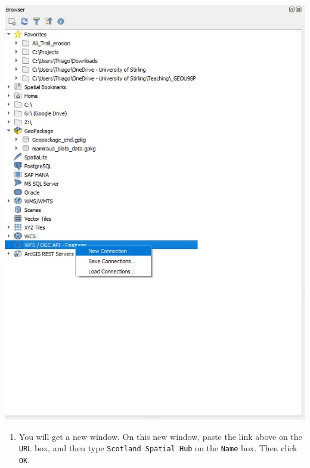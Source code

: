 \documentclass[
  letterpaper,
  DIV=11,
  numbers=noendperiod]{scrreprt}
\providecommand{\tightlist}{%
  \setlength{\itemsep}{0pt}\setlength{\parskip}{0pt}}\usepackage{longtable,booktabs,array}
\begin{document}
\includegraphics{images/lab_11/lab_11_fig_1_WFS_new.jpg}

\begin{enumerate}
\def\labelenumi{(\arabic{enumi})}
\setcounter{enumi}{303}
\tightlist
\item
  You will get a new window. On this new window, paste the link above on
  the \texttt{URL} box, and then type \texttt{Scotland\ Spatial\ Hub} on
  the \texttt{Name} box. Then click \texttt{OK}.
\end{enumerate}
\end{document}
